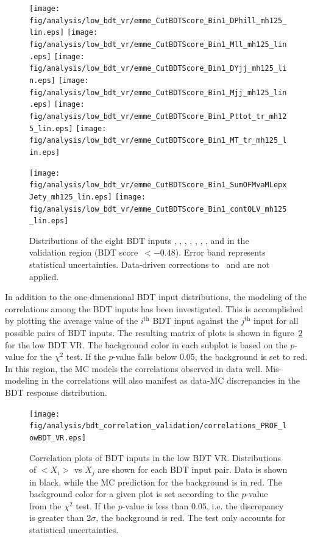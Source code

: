 \begin{figure}[p!]
  \centering
  \texttt{[image: fig/analysis/low\_bdt\_vr/emme\_CutBDTScore\_Bin1\_DPhill\_mh125\_lin.eps]}
   \texttt{[image: fig/analysis/low\_bdt\_vr/emme\_CutBDTScore\_Bin1\_Mll\_mh125\_lin.eps]}
   \texttt{[image: fig/analysis/low\_bdt\_vr/emme\_CutBDTScore\_Bin1\_DYjj\_mh125\_lin.eps]}
   \texttt{[image: fig/analysis/low\_bdt\_vr/emme\_CutBDTScore\_Bin1\_Mjj\_mh125\_lin.eps]}
   \texttt{[image: fig/analysis/low\_bdt\_vr/emme\_CutBDTScore\_Bin1\_Pttot\_tr\_mh125\_lin.eps]}
   \texttt{[image: fig/analysis/low\_bdt\_vr/emme\_CutBDTScore\_Bin1\_MT\_tr\_mh125\_lin.eps]}

   \texttt{[image: fig/analysis/low\_bdt\_vr/emme\_CutBDTScore\_Bin1\_SumOFMvaMLepxJety\_mh125\_lin.eps]}
   \texttt{[image: fig/analysis/low\_bdt\_vr/emme\_CutBDTScore\_Bin1\_contOLV\_mh125\_lin.eps]}
   \caption{Distributions of the eight BDT inputs \dphill, \mll, \dyjj, \mjj, \pTtot,  \mT,
     \SumMlj, and \lepEtaCent in the \emme validation region (BDT
     score~$<-0.48$). Error band represents statistical
     uncertainties. Data-driven corrections to \ttbar~and \ZDY are not applied.}
  \label{chap:analysis:fig:low_bdt_vr_df}
\end{figure}

In addition to the one-dimensional BDT input distributions, the
modeling of the correlations among the BDT inputs has been
investigated. This is accomplished by plotting the average value of
the $i^{\textrm{th}}$ BDT input against the $j^{\textrm{th}}$ input
for all possible pairs of BDT inputs. The resulting matrix of
plots is shown in figure~\ref{chap:analysis:fig:bdt_corr_vr} for the
low BDT VR. The background color in each subplot is based on the
$p$-value for the $\chi^2$ test. If the $p$-value falls below 0.05,
the background is set to red. In this region, the MC models the correlations observed in
data well. Mis-modeling in the correlations will also manifest as
data-MC discrepancies in the BDT response distribution. 

\begin{figure}[h]
  \centering
  \texttt{[image: fig/analysis/bdt\_correlation\_validation/correlations\_PROF\_lowBDT\_VR.eps]}
  \caption{Correlation plots of BDT inputs in the low BDT VR. Distributions of
    $< X_i >$ vs $X_j$ are shown for each BDT input pair. Data is
    shown in black, while the MC prediction for the background is in
    red. The background color for a given plot is set according to the
  $p$-value from the $\chi^2$ test. If the $p$-value is less than
    0.05, i.e. the discrepancy is greater than 2$\sigma$, the
    background is red. The test only accounts for statistical uncertainties.}
  \label{chap:analysis:fig:bdt_corr_vr}
\end{figure}

